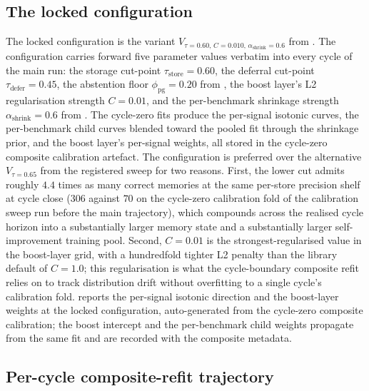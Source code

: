 

\subsection{The locked configuration}
\label{sec:adj-locked}

The locked configuration is the variant $V_{\tau=0.60,\,C=0.010,\,\alpha_{\text{shrink}}=0.6}$ from . The configuration carries forward five parameter values verbatim into every cycle of the main run: the storage cut-point $\tau_{\text{store}} = 0.60$, the deferral cut-point $\tau_{\text{defer}} = 0.45$, the abstention floor $\phi_{\text{pg}} = 0.20$ from , the boost layer's L2 regularisation strength $C = 0.01$, and the per-benchmark shrinkage strength $\alpha_{\text{shrink}} = 0.6$ from . The cycle-zero fits produce the per-signal isotonic curves, the per-benchmark child curves blended toward the pooled fit through the shrinkage prior, and the boost layer's per-signal weights, all stored in the cycle-zero composite calibration artefact. The configuration is preferred over the alternative $V_{\tau=0.65}$ from the registered sweep for two reasons. First, the lower cut admits roughly $4.4$ times as many correct memories at the same per-store precision shelf at cycle close ($306$ against $70$ on the cycle-zero calibration fold of the calibration sweep run before the main trajectory), which compounds across the realised cycle horizon into a substantially larger memory state and a substantially larger self-improvement training pool. Second, $C=0.01$ is the strongest-regularised value in the boost-layer grid, with a hundredfold tighter L2 penalty than the library default of $C = 1.0$; this regularisation is what the cycle-boundary composite refit relies on to track distribution drift without overfitting to a single cycle's calibration fold.  reports the per-signal isotonic direction and the boost-layer weights at the locked configuration, auto-generated from the cycle-zero composite calibration; the boost intercept and the per-benchmark child weights propagate from the same fit and are recorded with the composite metadata.



\subsection{Per-cycle composite-refit trajectory}
\label{sec:adj-trajectory}

